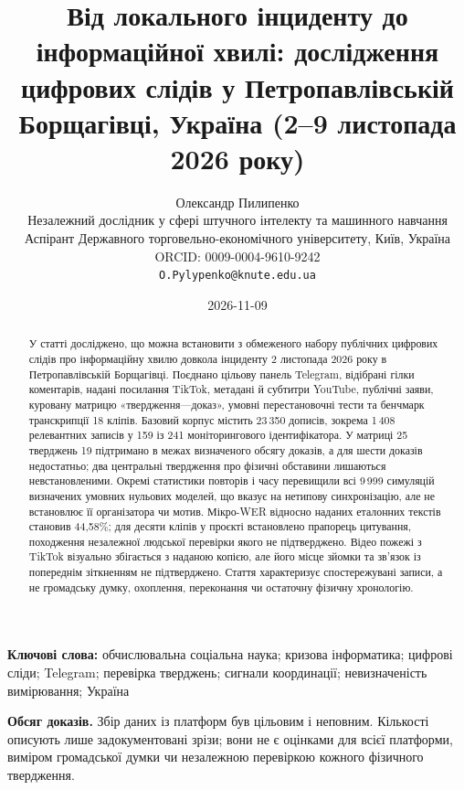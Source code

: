 \title{\LARGE Від локального інциденту до інформаційної хвилі: дослідження цифрових слідів у Петропавлівській Борщагівці, Україна (2–9 листопада 2026 року)}
\author{Олександр Пилипенко\\[0.4em]
\small Незалежний дослідник у сфері штучного інтелекту та машинного навчання\\[0.2em]
\small Аспірант Державного торговельно-економічного університету, Київ, Україна\\[0.2em]
\small ORCID: 0009-0004-9610-9242\\[0.2em]
\small \texttt{O.Pylypenko@knute.edu.ua}}
\date{2026-11-09}
\maketitle

\begin{abstract}
\noindent У статті досліджено, що можна встановити з обмеженого набору публічних цифрових слідів про інформаційну хвилю довкола інциденту 2 листопада 2026 року в Петропавлівській Борщагівці. Поєднано цільову панель Telegram, відібрані гілки коментарів, надані посилання TikTok, метадані й субтитри YouTube, публічні заяви, куровану матрицю «твердження—доказ», умовні перестановочні тести та бенчмарк транскрипції 18 кліпів. Базовий корпус містить 23\,350 дописів, зокрема 1\,408 релевантних записів у 159 із 241 моніторингового ідентифікатора. У матриці 25 тверджень 19 підтримано в межах визначеного обсягу доказів, а для шести доказів недостатньо; два центральні твердження про фізичні обставини лишаються невстановленими. Окремі статистики повторів і часу перевищили всі 9\,999 симуляцій визначених умовних нульових моделей, що вказує на нетипову синхронізацію, але не встановлює її організатора чи мотив. Мікро-WER відносно наданих еталонних текстів становив 44,58\%; для десяти кліпів у проєкті встановлено прапорець цитування, походження незалежної людської перевірки якого не підтверджено. Відео пожежі з TikTok візуально збігається з наданою копією, але його місце зйомки та зв'язок із попереднім зіткненням не підтверджено. Стаття характеризує спостережувані записи, а не громадську думку, охоплення, переконання чи остаточну фізичну хронологію.
\end{abstract}

\noindent\textbf{Ключові слова:} обчислювальна соціальна наука; кризова інформатика; цифрові сліди; Telegram; перевірка тверджень; сигнали координації; невизначеність вимірювання; Україна

\noindent\textbf{Обсяг доказів.} Збір даних із платформ був цільовим і неповним. Кількості описують лише задокументовані зрізи; вони не є оцінками для всієї платформи, виміром громадської думки чи незалежною перевіркою кожного фізичного твердження.

